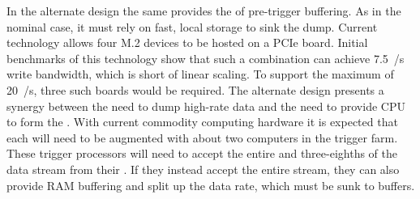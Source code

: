 In the alternate design the same  provides the
\snbpretime of pre-trigger  buffering. 
As in the nominal case, it must rely on fast, local 
storage to sink the dump. 
Current  technology allows four M.2  devices to
be hosted on a PCIe board. 
Initial benchmarks of this technology show that such a combination can
achieve \SI{7.5}{\GB/\s} write bandwidth, which is short of linear
scaling. 
To support the maximum of \SI{20}{\GB/\s}, three such boards would be
required.
The alternate design presents a synergy between the need to dump
high-rate data and the need to provide CPU to form the
. 
With current commodity computing hardware it is expected that each
 will need to be augmented with about two computers in the trigger
farm. 
These trigger processors will need to accept the entire \dual and
three-eighths of the \single data stream from their . 
If they instead accept the entire stream, they can also provide
RAM buffering and split up the data rate, which must be sunk to
 buffers.


